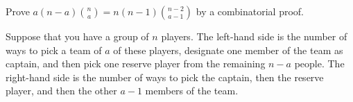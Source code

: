 \question Prove $a(n - a)\binom{n}{a} = n(n - 1)\binom{n - 2}{a - 1}$ 
by a combinatorial proof.
\begin{solution}[3cm]
Suppose that you have a group of $n$ players. The left-hand side is 
the number of ways to pick a team of $a$ of these players, designate 
one member of the team as captain, and then pick one reserve player 
from the remaining $n - a$ people. The right-hand side is the number 
of ways to pick the captain, then the reserve player, and then the 
other $a - 1$ members of the team.
\end{solution}